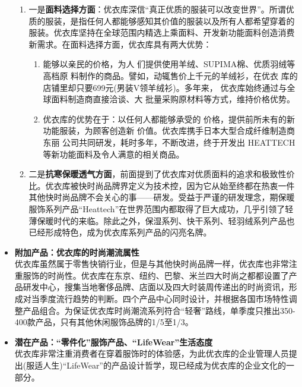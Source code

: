 \documentclass{xjtureport}
\begin{document}
\begin{itemize}
\begin{enumerate}
        \item 一是\textbf{面料选择方面}：优衣库深信“真正优质的服装可以改变世界”。所谓优质的服装，是指任何人都能够感知其价值的服装以及所有人都希望穿着的服装。\cite{ref6}优衣库坚持在全球范围内精选上乘面料、开发新功能面料创造消费新需求。在面料选择方面，优衣库具有两大优势：
        \begin{enumerate}
            \item 能够以亲民的价格，为人
            们提供使用羊绒、SUPIMA棉、优质羽绒等高档原
            料制作的商品。譬如，动辄售价上千元的羊绒衫，在优衣
            库的店铺里却只要699元(男装V领羊绒衫)。多年来，
            优衣库始终通过与全球面料制造商直接洽谈、大
            批量采购原材料等方式，维持价格优势。
            \item 优衣库的优势在于：以任何人都能够承受的
            价格，提供前所未有的新功能服装，为顾客创造新
            价值。优衣库携手日本大型合成纤维制造商东丽
            公司共同研发，耗时多年，不断改进，终于开发出
            HEATTECH等新功能面料及令人满意的相关商品。
        \end{enumerate}
        \item 二是\textbf{抗寒保暖透气方面}，前面提到了优衣库对优质面料的追求和极致性价比。优衣库被快时尚品牌界定义为技术控，因为它从始至终都在热衷一件其他快时尚品牌不会关心的事——研发。受益于严谨的研发理念，期保暖服饰系列产品“Heattech”在世界范围内都取得了巨大成功，几乎引领了轻薄保暖时代的来临。除此之外，保湿系列、快干系列、轻羽绒系列产品也已经形成特色，成为优衣库系列产品的闪亮名牌。
    \end{enumerate}
    \item \textbf{附加产品：优衣库的时尚潮流属性}\\
    优衣库虽然属于零售快销行业，但是与其他快时尚品牌一样，优衣库也非常注重服饰的时尚性。优衣库在东京、纽约、巴黎、米兰四大时尚之都都设置了产品研发中心，搜集当地奢侈品牌、店面以及四大时装周传递出的时尚资讯，形成对当季度流行趋势的判断。四个产品中心同时设计，并根据各国市场特性调整产品组合。为保证优衣库时尚潮流系列符合“轻奢”路线，单季度只推出350-400款产品，只有其他休闲服饰品牌的1/5至1/3。\cite{ref7}
    
%   

    \item \textbf{潜在产品：“零件化”服饰产品、“LifeWear”生活态度}
    \\优衣库非常注重消费者在穿着服饰时的体验感，为此优衣库的企业管理人员提出(服适人生)“LifeWear”的产品设计哲学，现已经成为优衣库的企业文化的一部分。
        

\end{itemize}
\end{document}
